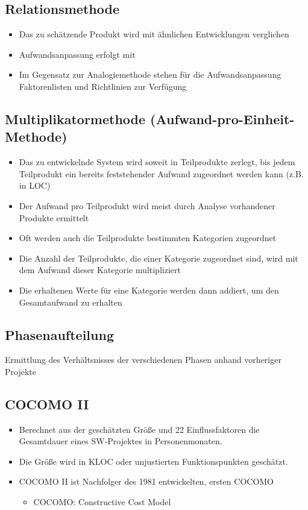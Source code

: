 \subsection{Relationsmethode}
\begin{itemize}
    \item Das zu schätzende Produkt wird mit ähnlichen Entwicklungen verglichen
    \item Aufwandsanpassung erfolgt mit 
    \item Im Gegensatz zur Analogiemethode stehen für die Aufwandsanpassung Faktorenlisten und Richtlinien zur Verfügung
\end{itemize}

\subsection{Multiplikatormethode (Aufwand-pro-Einheit-Methode)}
\begin{itemize}
    \item Das zu entwickelnde System wird soweit in Teilprodukte zerlegt, bis jedem Teilprodukt ein bereits feststehender Aufwand zugeordnet werden kann (z.B. in LOC)
    \item Der Aufwand pro Teilprodukt wird meist durch Analyse vorhandener Produkte ermittelt
    \item Oft werden auch die Teilprodukte bestimmten Kategorien zugeordnet
    \item Die Anzahl der Teilprodukte, die einer Kategorie zugeordnet sind, wird mit dem Aufwand dieser Kategorie multipliziert
    \item Die erhaltenen Werte für eine Kategorie werden dann addiert, um den Gesamtaufwand zu erhalten
\end{itemize}

\subsection{Phasenaufteilung}
Ermittlung des Verhältsnisses der verschiedenen Phasen anhand vorheriger Projekte

\subsection{COCOMO II}
\begin{itemize}
    \item Berechnet aus der geschätzten Größe und 22 Einflussfaktoren die Gesamtdauer eines SW-Projektes in Personenmonaten.
    \item Die Größe wird in KLOC oder unjustierten Funktionspunkten geschätzt.
    \item COCOMO II ist Nachfolger des 1981 entwickelten, ersten COCOMO
    \begin{itemize}
        \item COCOMO: Constructive Cost Model
    \end{itemize}
\end{itemize}

